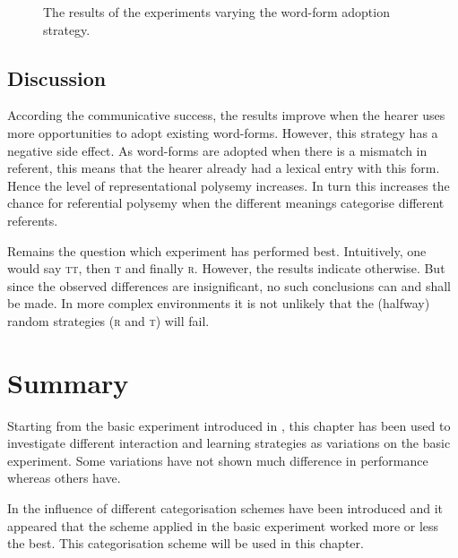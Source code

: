 \begin{figure}[p]
	\caption{The results of the experiments varying the word-form adoption strategy.}
	\label{f:par:ass}
\end{figure}
\subsection{Discussion}

According the communicative success, the results improve when the hearer uses more opportunities to adopt existing word-forms. However, this strategy has a negative side effect. As word-forms are adopted when there is a mismatch in referent, this means that the hearer already had a lexical entry with this form. Hence the level of representational polysemy increases. In turn this increases the chance for referential polysemy when the different meanings categorise different referents.

Remains the question which experiment has performed best. Intuitively, one would say {\scshape tt}, then {\scshape t} and finally {\scshape r}. However, the results indicate otherwise. But since the observed differences are insignificant, no such conclusions can and shall be made. In more complex environments it is not unlikely that the (halfway) random strategies ({\scshape r} and {\scshape t}) will fail.


\section{Summary}

Starting from the basic experiment introduced in , this chapter has been used to investigate different interaction and learning strategies as variations on the basic experiment. Some variations have not shown much difference in performance whereas others have.


In  the influence of different categorisation schemes have been introduced and it appeared that the scheme applied in the basic experiment worked more or less the best. This categorisation scheme will be used in this chapter. 


